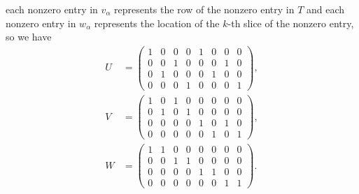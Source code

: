 \documentclass[a4paper]{article}
\begin{document}
each nonzero entry in $v_\alpha$ represents the row of the nonzero entry in
$T$ and each nonzero entry in $w_\alpha$ represents the location of the $k$-th
slice of the nonzero entry, so we have
\begin{align}
    U &=
    \begin{pmatrix}
        1 & 0 & 0 & 0 & 1 & 0 & 0 & 0\\
        0 & 0 & 1 & 0 & 0 & 0 & 1 & 0\\
        0 & 1 & 0 & 0 & 0 & 1 & 0 & 0\\
        0 & 0 & 0 & 1 & 0 & 0 & 0 & 1
    \end{pmatrix},\\
    V &=
    \begin{pmatrix}
        1 & 0 & 1 & 0 & 0 & 0 & 0 & 0\\
        0 & 1 & 0 & 1 & 0 & 0 & 0 & 0\\
        0 & 0 & 0 & 0 & 1 & 0 & 1 & 0\\
        0 & 0 & 0 & 0 & 0 & 1 & 0 & 1
    \end{pmatrix},\\
    W &=
    \begin{pmatrix}
        1 & 1 & 0 & 0 & 0 & 0 & 0 & 0\\
        0 & 0 & 1 & 1 & 0 & 0 & 0 & 0\\
        0 & 0 & 0 & 0 & 1 & 1 & 0 & 0\\
        0 & 0 & 0 & 0 & 0 & 0 & 1 & 1
    \end{pmatrix}.
\end{align}
\end{document}

